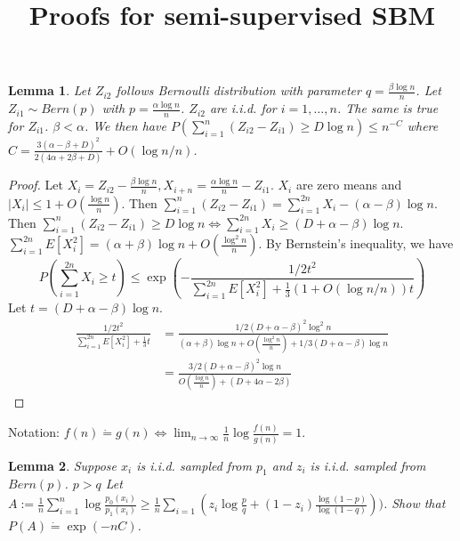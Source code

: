 \documentclass{article}
\title{Proofs for semi-supervised SBM}
\newtheorem{lemma}{Lemma}
\begin{document}
\maketitle
\begin{lemma}
Let $Z_{i2}$ follows Bernoulli distribution with parameter $q=\frac{\beta \log n }{n}$.
Let $Z_{i1} \sim Bern(p)$ with $p=\frac{\alpha \log n }{n}$. $Z_{i2}$ are i.i.d. for $i=1,\dots, n$.
The same is true for $Z_{i1}$. $\beta < \alpha$.
We then have $P(\sum_{i=1}^{n} (Z_{i2} - Z_{i1}) \geq  D \log n) \leq n^{-C}$
where $C=\frac{3(\alpha - \beta + D)^2}{2(4\alpha + 2\beta + D)} + O(\log n /n)$.
\end{lemma}
\begin{proof}
	Let $X_i = Z_{i2} - \frac{\beta \log n }{n}, X_{i+n} = \frac{\alpha \log n }{n} - Z_{i1}$.
	$X_i$ are zero means and $|X_i| \leq 1 + O(\frac{\log n}{n})$.
	Then $\sum_{i=1}^{n} (Z_{i2} - Z_{i1}) = \sum_{i=1}^{2n} X_{i} - (\alpha - \beta)\log n $.
	Then $\sum_{i=1}^{n} (Z_{i2} - Z_{i1}) \geq D \log n \iff \sum_{i=1}^{2n} X_{i} \geq (D + \alpha - \beta)\log n$.
	$\sum_{i=1}^{2n} E[X_i^2] = (\alpha + \beta)\log n + O(\frac{\log^2 n}{n})$.
	By Bernstein's inequality, we have
	$$
	P(\sum_{i=1}^{2n} X_{i}  \geq t) \leq \exp(-\frac{1/2 t^2}{\sum_{i=1}^{2n} E[X_i^2] + \frac{1}{3}(1+O(\log n /n))t})
	$$
	Let $t=(D + \alpha - \beta)\log n$.
	\begin{align}
	\frac{1/2 t^2}{\sum_{i=1}^{2n} E[X_i^2] + \frac{1}{3}t} & 
	= \frac{1/2(D + \alpha - \beta)^2\log^2 n}{(\alpha + \beta)\log n + O(\frac{\log^2 n}{n}) + 1/3(D + \alpha - \beta)\log n } \\
	 & =\frac{3/2(D + \alpha - \beta)^2\log n}{O(\frac{\log n}{n}) + (D + 4\alpha - 2\beta) }
	\end{align}
\end{proof}
Notation: $f(n)\dot{=} g(n) \iff \lim_{n\to \infty} \frac{1}{n} \log \frac{f(n)}{g(n)} = 1$.
\begin{lemma}\label{lem:coupled}
	Suppose $x_i$ is i.i.d. sampled from $p_1$ and $z_i$ is i.i.d. sampled from $Bern(p)$.
	$p > q$
Let $A := \frac{1}{n}\sum_{i=1}^n \log \frac{p_0(x_i)}{p_1(x_i)} \geq \frac{1}{n} \sum_{i=1}(z_i \log\frac{p}{q} +(1-z_i) \frac{\log(1-p)}{\log(1-q)}))$.
Show that $P(A) \dot{=} \exp(-n C)$.
\end{lemma}
\end{document}
